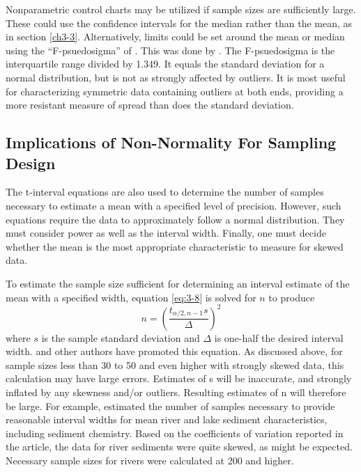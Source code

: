 \documentclass[]{book}
\begin{document}
Nonparametric control charts may be utilized if sample sizes are sufficiently large. These could use the confidence intervals for the median rather than the mean, as in section \ref{ch3-3}. Alternatively, limits could be set around the mean or median using the ``F-psuedosigma'' of \citet{hoaglin_understanding_1983}. This was done by \citet{schroder_results_1987}. The F-psuedosigma is the interquartile range divided by 1.349. It equals the standard deviation for a normal distribution, but is not as strongly affected by outliers. It is most useful for characterizing symmetric data containing outliers at both ends, providing a more resistant measure of spread than does the standard deviation.

\hypertarget{implications-of-non-normality-for-sampling-design}{%
\subsection{Implications of Non-Normality For Sampling Design}\label{implications-of-non-normality-for-sampling-design}}

The t-interval equations are also used to determine the number of samples necessary to estimate a mean with a specified level of precision. However, such equations require the data to approximately follow a normal distribution. They must consider power as well as the interval width. Finally, one must decide whether the mean is the most appropriate characteristic to measure for skewed data.

To estimate the sample size sufficient for determining an interval estimate of the mean with a specified width, equation \eqref{eq:3-8} is solved for \(n\) to produce
\begin{equation}
n = \left( \frac{t_{\alpha / 2, n - 1}s}{\Delta} \right)^{2}
\label{eq:3-20}
\end{equation}
where \(s\) is the sample standard deviation and \(\Delta\) is one-half the desired interval width. \citet{sanders_design_1983} and other authors have promoted this equation. As discussed above, for sample sizes less than 30 to 50 and even higher with strongly skewed data, this calculation may have large errors. Estimates of s will be inaccurate, and strongly inflated by any skewness and/or outliers. Resulting estimates of n will therefore be large. For example, \citet{haakanson_sediment_1984} estimated the number of samples necessary to provide reasonable interval widths for mean river and lake sediment characteristics, including sediment chemistry. Based on the coefficients of variation reported in the article, the data for river sediments were quite skewed, as might be expected. Necessary sample sizes for rivers were calculated at 200 and higher.
\end{document}
